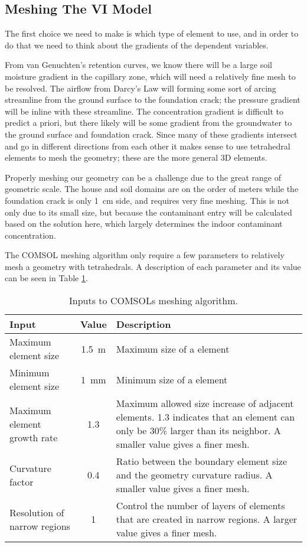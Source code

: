 \subsection{Meshing The VI Model}

The first choice we need to make is which type of element to use, and in order to do that we need to think about the gradients of the dependent variables.\par

From van Genuchten's retention curves, we know there will be a large soil moisture gradient in the capillary zone, which will need a relatively fine mesh to be resolved.
The airflow from Darcy's Law will forming some sort of arcing streamline from the ground surface to the foundation crack; the pressure gradient will be inline with these streamline.
The concentration gradient is difficult to predict a priori, but there likely will be some gradient from the groundwater to the ground surface and foundation crack.
Since many of these gradients intersect and go in different directions from each other it makes sense to use tetrahedral elements to mesh the geometry; these are the more general 3D elements.\par

Properly meshing our geometry can be a challenge due to the great range of geometric scale.
The house and soil domains are on the order of meters while the foundation crack is only \SI{1}{\centi\meter} side, and requires very fine meshing.
This is not only due to its small size, but because the contaminant entry will be calculated based on the solution here, which largely determines the indoor contaminant concentration.\par

The COMSOL meshing algorithm only require a few parameters to relatively mesh a geometry with tetrahedrals.
A description of each parameter and its value can be seen in Table \ref{tbl:meshing}.
\begin{table}[htb!]
  \begin{tabularx}{\linewidth}{l c X}
    \toprule
    Input & Value & Description \\
    \midrule
    Maximum element size & \SI{1.5}{\metre} & Maximum size of a element \\
    Minimum element size & \SI{1}{\milli\metre} & Minimum size of a element \\
    Maximum element growth rate & 1.3 & Maximum allowed size increase of adjacent elements. 1.3 indicates that an element can only be 30\% larger than its neighbor. A smaller value gives a finer mesh. \\
    Curvature factor & 0.4 & Ratio between the boundary element size and the geometry curvature radius. A smaller value gives a finer mesh. \\
    Resolution of narrow regions & 1 & Control the number of layers of elements that are created in narrow regions. A larger value gives a finer mesh. \\
    \bottomrule
  \end{tabularx}
  \caption{Inputs to COMSOLs meshing algorithm.}
  \label{tbl:meshing}
\end{table}

